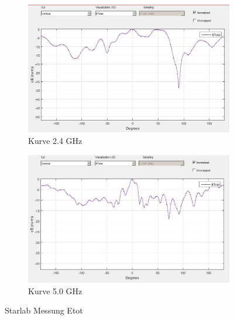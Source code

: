 \begin{figure}[h!]
	\begin{center}
		\begin{subfigure}[t]{0.49\textwidth}
			\begin{center}
				\includegraphics[width=1\textwidth]{../fig/plt/2_4GHz_E_tot_curve.jpg}
				\caption{Kurve 2.4 GHz}
				\label{fig:curve_2ghz4}
			\end{center}
		\end{subfigure}
		\begin{subfigure}[t]{0.49\textwidth}
			\begin{center}
				\includegraphics[width=1\textwidth]{../fig/plt/5GHz_E_tot_curve.jpg}
				\caption{Kurve 5.0 GHz}
				\label{fig:curve_5ghz0}
			\end{center}
		\end{subfigure}
		\caption{Starlab Messung Etot}
		\label{fig:starlab_etot_curve}
	\end{center}
\end{figure}



